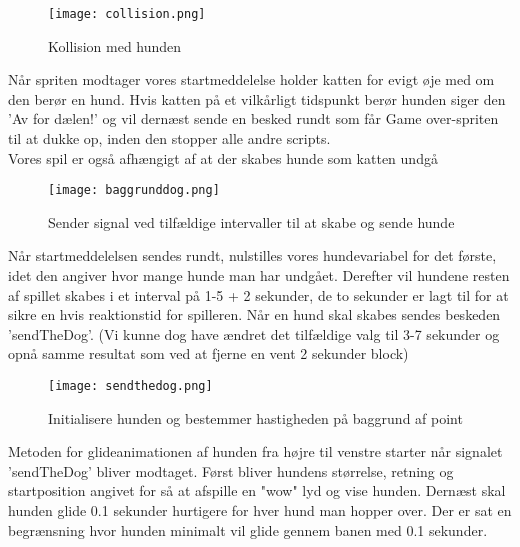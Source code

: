 \begin{figure}[ht]
	\centering
	\texttt{[image: collision.png]}
	\caption{{Kollision med hunden}}
	\label{fig:coll}
\end{figure}

Når spriten modtager vores startmeddelelse holder katten for evigt øje med om den berør en hund. Hvis katten på et vilkårligt tidspunkt berør hunden siger den 'Av for dælen!' og vil dernæst sende en besked rundt som får Game over-spriten til at dukke op, inden den stopper alle andre scripts.\\
\clearpage
Vores spil er også afhængigt af at der skabes hunde som katten undgå\\

\begin{figure}[ht]
	\centering
	\texttt{[image: baggrunddog.png]}
	\caption{{Sender signal ved tilfældige intervaller til at skabe og sende hunde}}
	\label{fig:dog_sig}
\end{figure}

Når startmeddelelsen sendes rundt, nulstilles vores hundevariabel for det første, idet den angiver hvor mange hunde man har undgået. Derefter vil hundene resten af spillet skabes i et interval på 1-5 + 2 sekunder, de to sekunder er lagt til for at sikre en hvis reaktionstid for spilleren. Når en hund skal skabes sendes beskeden 'sendTheDog'. (Vi kunne dog have ændret det tilfældige valg til 3-7 sekunder og opnå samme resultat som ved at fjerne en vent 2 sekunder block)\\

\begin{figure}[ht]
	\centering
	\texttt{[image: sendthedog.png]}
	\caption{{Initialisere hunden og bestemmer hastigheden på baggrund af point}}
	\label{fig:dog_init}
\end{figure}

Metoden for glideanimationen af hunden fra højre til venstre starter når signalet 'sendTheDog' bliver modtaget. Først bliver hundens størrelse, retning og startposition angivet for så at afspille en "wow" lyd og vise hunden. Dernæst skal hunden glide 0.1 sekunder hurtigere for hver hund man hopper over. Der er sat en begrænsning hvor hunden minimalt vil glide gennem banen med 0.1 sekunder. 
